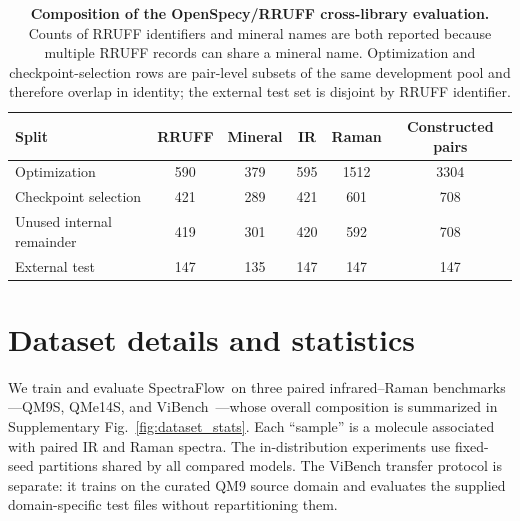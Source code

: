 \documentclass[pdflatex,sn-mathphys-num]{sn-jnl}%
\newcommand{\mname}{SpectraFlow}
\theoremstyle{thmstyleone}%
\theoremstyle{thmstyletwo}%
\theoremstyle{thmstylethree}%
\begin{document}
\begin{appendices}
\begin{table}[htbp]
\centering
\caption{\textbf{Composition of the OpenSpecy/RRUFF cross-library evaluation.} Counts of RRUFF identifiers and mineral names are both reported because multiple RRUFF records can share a mineral name. Optimization and checkpoint-selection rows are pair-level subsets of the same development pool and therefore overlap in identity; the external test set is disjoint by RRUFF identifier.  }
\label{tab:rruff-split}
\scriptsize
\setlength{\tabcolsep}{6pt}
\begin{tabular}{lccccc}
\toprule
Split & RRUFF & Mineral & IR & Raman & Constructed pairs \\
\midrule
Optimization & 590 & 379 & 595 & 1512 & 3304 \\
Checkpoint selection & 421 & 289 & 421 & 601 & 708 \\
Unused internal remainder & 419 & 301 & 420 & 592 & 708 \\
External test & 147 & 135 & 147 & 147 & 147 \\
\bottomrule
\end{tabular}
\end{table}


\section{Dataset details and statistics}\label{app:data}

We train and evaluate \mname\ on three paired infrared--Raman benchmarks---QM9S, QMe14S, and ViBench~\citep{lu2025vib2mol,yuan2025qme14s}---whose overall composition is summarized in Supplementary Fig.~\ref{fig:dataset_stats}. Each ``sample'' is a molecule associated with paired IR and Raman spectra. The in-distribution experiments use fixed-seed partitions shared by all compared models. The ViBench transfer protocol is separate: it trains on the curated QM9 source domain and evaluates the supplied domain-specific test files without repartitioning them.


\end{appendices}
\end{document}
